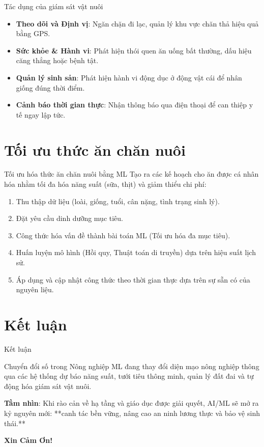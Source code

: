 \documentclass[aspectratio=169]{beamer}
\begin{document}
\begin{frame}{Tác dụng của giám sát vật nuôi}
    \begin{itemize}
        \item \textbf{Theo dõi và Định vị}: Ngăn chặn đi lạc, quản lý khu vực chăn thả hiệu quả bằng GPS.
        \item \textbf{Sức khỏe \& Hành vi}: Phát hiện thói quen ăn uống bất thường, dấu hiệu căng thẳng hoặc bệnh tật.
        \item \textbf{Quản lý sinh sản}: Phát hiện hành vi động dục ở động vật cái để nhân giống đúng thời điểm.
        \item \textbf{Cảnh báo thời gian thực}: Nhận thông báo qua điện thoại để can thiệp y tế ngay lập tức.
    \end{itemize}
\end{frame}

\section{Tối ưu thức ăn chăn nuôi}
\begin{frame}{Tối ưu hóa thức ăn chăn nuôi bằng ML}
    Tạo ra các kế hoạch cho ăn được cá nhân hóa nhằm tối đa hóa năng suất (sữa, thịt) và giảm thiểu chi phí:
    \begin{enumerate}
        \item Thu thập dữ liệu (loài, giống, tuổi, cân nặng, tình trạng sinh lý).
        \item Đặt yêu cầu dinh dưỡng mục tiêu.
        \item Công thức hóa vấn đề thành bài toán ML (Tối ưu hóa đa mục tiêu).
        \item Huấn luyện mô hình (Hồi quy, Thuật toán di truyền) dựa trên hiệu suất lịch sử.
        \item Áp dụng và cập nhật công thức theo thời gian thực dựa trên sự sẵn có của nguyên liệu.
    \end{enumerate}
\end{frame}

\section{Kết luận}
\begin{frame}{Kết luận}
    \begin{block}{Chuyển đổi số trong Nông nghiệp}
        ML đang thay đổi diện mạo nông nghiệp thông qua các hệ thống dự báo năng suất, tưới tiêu thông minh, quản lý đất đai và tự động hóa giám sát vật nuôi.
    \end{block}
    
    \vspace{0.3cm}
    \textbf{Tầm nhìn}: 
    Khi rào cản về hạ tầng và giáo dục được giải quyết, AI/ML sẽ mở ra kỷ nguyên mới: **canh tác bền vững, nâng cao an ninh lương thực và bảo vệ sinh thái.**
\end{frame}

\begin{frame}
    \centering \Huge \textbf{Xin Cảm Ơn!}
\end{frame}
\end{document}

